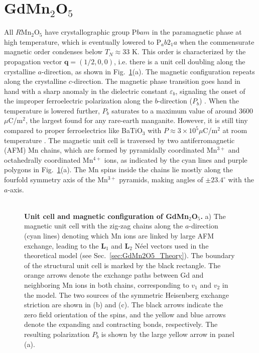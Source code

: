 \section{GdMn$_2$O$_5$}
All $R$Mn$_2$O$_5$ have crystallographic group P$bam$ \cite{Alonso97} in the paramagnetic phase at high temperature, which is eventually lowered to P$_ab2_1a$ when the commensurate magnetic order condenses below $T_{N} \approx 33$ K.
This order is characterized by the propagation vector $\bm{q} = (1/2, 0, 0)$, i.e. there is a unit cell doubling along the crystalline $a$-direction, as shown in Fig.~\ref{fig:GdMn2O5_unit_cell}(a).
The magnetic configuration repeats along the crystalline $c$-direction. The magnetic phase transition goes hand in hand with a sharp anomaly in the dielectric constant $\varepsilon_b$, signaling the onset of the improper ferroelectric polarization  along the $b$-direction ($P_b$) \cite{Vecchini08,Lee13,Vecchini14}.
When the temperature is lowered further, $P_b$ saturates to a maximum value of around 3600 $\mu$C/m$^2$, the largest found for any rare-earth manganite.
However, it is still tiny compared to proper ferroelectrics like BaTiO$_3$ with $P \approx 3 \times 10^5 \mu $C/m$^2$ at room temperature \cite{Mason1948,VonHippel1950}.
The magnetic unit cell is traversed by two antiferromagnetic (AFM) Mn chains, which are formed by pyramidally coordinated Mn$^{3+}$ and octahedrally coordinated Mn$^{4+}$ ions, as indicated by the cyan lines and purple polygons in Fig.~\ref{fig:GdMn2O5_unit_cell}(a).
The Mn spins inside the chains lie mostly along the fourfold symmetry axis of the Mn$^{3+}$ pyramids, making angles of $\pm 23.4^\circ$ with the $a$-axis.
\\\\
\begin{figure}
	\caption{\label{fig:GdMn2O5_unit_cell}{\bf Unit cell and magnetic configuration of GdMn$_2$O$_5$.} a) The magnetic unit cell with the zig-zag chains along the $a$-direction (cyan lines) denoting which Mn ions are linked by large AFM exchange, leading to the $\bm{L}_1$ and $\bm{L}_2$ N\'eel vectors used in the theoretical model (see Sec.~\ref{sec:GdMn2O5_Theory}). The boundary of the structural unit cell is marked by the black rectangle. The orange arrows denote the exchange paths between Gd and neighboring Mn ions in both chains, corresponding to $v_1$ and $v_2$ in the model. The two sources of the symmetric Heisenberg exchange striction are shown in (b) and (c). The black arrows indicate the zero field orientation of the spins, and the yellow and blue arrows denote the expanding and contracting bonds, respectively. The resulting polarization $P_b$ is shown by the large yellow arrow  in panel (a).}
\end{figure}
